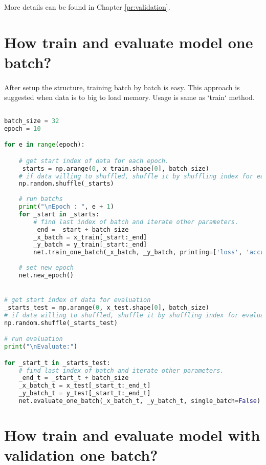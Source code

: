 \documentclass[12pt]{report}
\begin{document}
More details can be found in Chapter \ref{pr:validation}.




\section{How train and evaluate model one batch?}
\paragraph{}
After setup the structure, training batch by batch is easy. This approach is suggested when data is to big to load memory. Usage is same as `train` method.

\begin{lstlisting}[language=Python, numbers=none, caption={Train and evaluate model on batch.}, label={ex:train-batch}]
    
batch_size = 32
epoch = 10

for e in range(epoch):

	# get start index of data for each epoch.
	_starts = np.arange(0, x_train.shape[0], batch_size)
	# if data willing to shuffled, shuffle it by shuffling index for each epoch.
	np.random.shuffle(_starts)
	
	# run batchs 
	print("\nEpoch : ", e + 1)
	for _start in _starts:
		# find last index of batch and iterate other parameters.
		_end = _start + batch_size                
		_x_batch = x_train[_start:_end]
		_y_batch = y_train[_start:_end]
		net.train_one_batch(_x_batch, _y_batch, printing=['loss', 'accuracy'], single_batch=False)
	
	# set new epoch 
	net.new_epoch()


# get start index of data for evaluation
_starts_test = np.arange(0, x_test.shape[0], batch_size)
# if data willing to shuffled, shuffle it by shuffling index for evaluation
np.random.shuffle(_starts_test)

# run evaluation
print("\nEvaluate:")

for _start_t in _starts_test:
	# find last index of batch and iterate other parameters.
	_end_t = _start_t + batch_size                
	_x_batch_t = x_test[_start_t:_end_t]
	_y_batch_t = y_test[_start_t:_end_t]
	net.evaluate_one_batch(_x_batch_t, _y_batch_t, single_batch=False)

\end{lstlisting}




\section{How train and evaluate model with validation one batch?}
\end{document}
